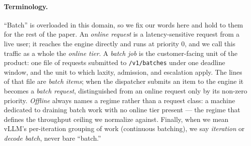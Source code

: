 \documentclass[11pt]{article}
\newcommand{\code}[1]{\texttt{#1}}
\begin{document}
\paragraph{Terminology.} ``Batch'' is overloaded in this domain, so we fix our words
here and hold to them for the rest of the paper. An \emph{online request} is a
latency-sensitive request from a live user; it reaches the engine directly and runs at
priority 0, and we call this traffic as a whole the \emph{online tier}. A \emph{batch
job} is the customer-facing unit of the product: one file of requests submitted to
\code{/v1/batches} under one deadline window, and the unit to which laxity, admission,
and escalation apply. The lines of that file are \emph{batch items}; when the
dispatcher submits an item to the engine it becomes a \emph{batch request},
distinguished from an online request only by its non-zero priority. \emph{Offline}
always names a regime rather than a request class: a machine dedicated to draining
batch work with no online tier present --- the regime that defines the throughput
ceiling we normalize against. Finally, when we mean vLLM's per-iteration grouping of
work (continuous batching), we say \emph{iteration} or \emph{decode batch}, never bare
``batch.''
\end{document}
